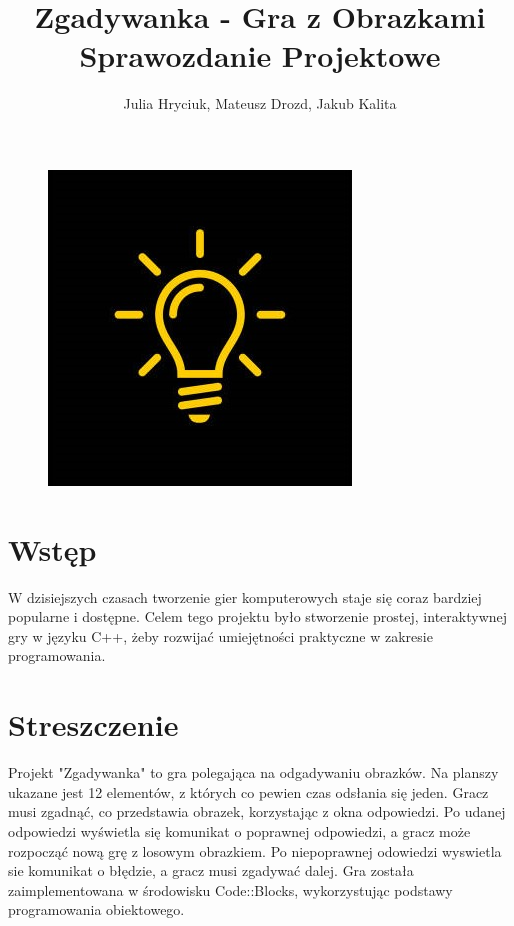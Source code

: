 \documentclass{article}
\title{Zgadywanka - Gra z Obrazkami \\ \Large{Sprawozdanie Projektowe}}
\author{Julia Hryciuk, Mateusz Drozd, Jakub Kalita}
\begin{document}
	\maketitle
	\begin{figure}[H]
		\centering
		\includegraphics[width=0.8\linewidth]{Ikona.jpg}
	\end{figure}

\tableofcontents
\newpage
	\section{Wstęp}
	W dzisiejszych czasach tworzenie gier komputerowych staje się coraz bardziej popularne i dostępne. Celem tego projektu było stworzenie prostej, interaktywnej gry w języku C++, żeby rozwijać umiejętności praktyczne w zakresie programowania.
	
	\section{Streszczenie}
	
	Projekt "Zgadywanka" to gra polegająca na odgadywaniu obrazków. Na planszy ukazane jest 12 elementów, z których co pewien czas odsłania się jeden. Gracz musi zgadnąć, co przedstawia obrazek, korzystając z okna odpowiedzi. Po udanej odpowiedzi wyświetla się komunikat o poprawnej odpowiedzi, a gracz może rozpocząć nową grę z losowym obrazkiem. Po niepoprawnej  odowiedzi wyswietla sie komunikat o błędzie, a gracz musi zgadywać dalej. Gra została zaimplementowana w środowisku Code::Blocks, wykorzystując podstawy programowania obiektowego.
	
\end{document}
